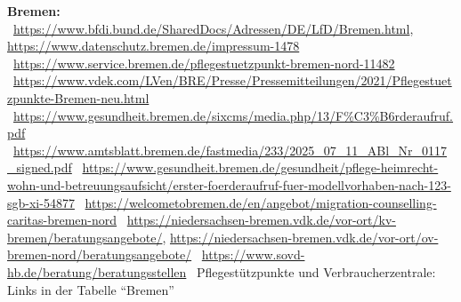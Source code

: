 \documentclass[10pt,parskip=half-]{scrartcl}
\begin{document}
{\tiny\raggedright\textbf{Bremen:}
\textbullet~\url{https://www.bfdi.bund.de/SharedDocs/Adressen/DE/LfD/Bremen.html},
        \url{https://www.datenschutz.bremen.de/impressum-1478}
\textbullet~\url{https://www.service.bremen.de/pflegestuetzpunkt-bremen-nord-11482}
\textbullet~\url{https://www.vdek.com/LVen/BRE/Presse/Pressemitteilungen/2021/Pflegestuetzpunkte-Bremen-neu.html}
\textbullet~\url{https://www.gesundheit.bremen.de/sixcms/media.php/13/F\%C3\%B6rderaufruf.pdf}
\textbullet~\url{https://www.amtsblatt.bremen.de/fastmedia/233/2025_07_11_ABl_Nr_0117_signed.pdf}
\textbullet~\url{https://www.gesundheit.bremen.de/gesundheit/pflege-heimrecht-wohn-und-betreuungsaufsicht/erster-foerderaufruf-fuer-modellvorhaben-nach-123-sgb-xi-54877}
\textbullet~\url{https://welcometobremen.de/en/angebot/migration-counselling-caritas-bremen-nord}
\textbullet~\url{https://niedersachsen-bremen.vdk.de/vor-ort/kv-bremen/beratungsangebote/},
        \url{https://niedersachsen-bremen.vdk.de/vor-ort/ov-bremen-nord/beratungsangebote/}
\textbullet~\url{https://www.sovd-hb.de/beratung/beratungsstellen}
\textbullet~Pflegestützpunkte und Verbraucherzentrale: Links in der Tabelle \enquote{Bremen}
\par}
\end{document}

